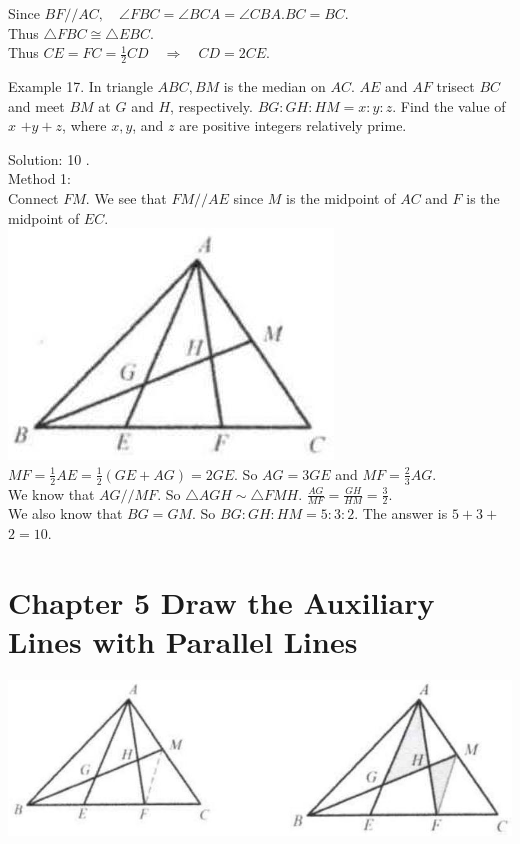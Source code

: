 \documentclass[10pt]{article}
\begin{document}
Since \(B F / / A C, \quad \angle F B C=\angle B C A=\angle C B A . B C=B C\).\\
Thus \(\triangle F B C \cong \triangle E B C\).\\
Thus \(C E=F C=\frac{1}{2} C D \quad \Rightarrow \quad C D=2 C E\).

Example 17. In triangle \(A B C, B M\) is the median on \(A C\). \(A E\) and \(A F\) trisect \(B C\) and meet \(B M\) at \(G\) and \(H\), respectively. \(B G: G H: H M=x: y: z\). Find the value of \(x\) \(+y+z\), where \(x, y\), and \(z\) are positive integers relatively prime.

Solution: 10 .\\
Method 1:\\
Connect \(F M\). We see that \(F M / / A E\) since \(M\) is the midpoint of \(A C\) and \(F\) is the midpoint of \(E C\).\\
\includegraphics[max width=\textwidth, center]{2025_04_17_97bc1f7e44d93c271a88g-118}\\
\(M F=\frac{1}{2} A E=\frac{1}{2}(G E+A G)=2 G E\). So \(A G=3 G E\) and \(M F=\frac{2}{3} A G\).\\
We know that \(A G / / M F\). So \(\triangle A G H \sim \triangle F M H\). \(\frac{A G}{M F}=\frac{G H}{H M}=\frac{3}{2}\).\\
We also know that \(B G=G M\). So \(B G: G H: H M=5: 3: 2\). The answer is \(5+3+\) \(2=10\).

\section*{Chapter 5 Draw the Auxiliary Lines with Parallel Lines}
\begin{center}
\includegraphics[max width=\textwidth]{2025_04_17_97bc1f7e44d93c271a88g-119}
\end{center}
\end{document}
